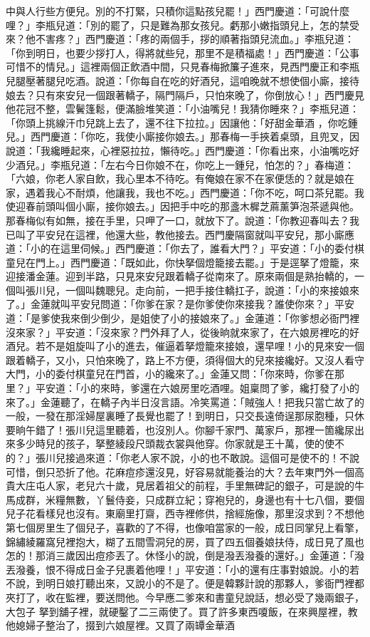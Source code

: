 中與人行些方便兒。別的不打緊，只積你這點孩兒罷！」西門慶道：「可說什麼哩？」李瓶兒道：「別的罷了，只是難為那女孩兒。虧那小嫩指頭兒上，怎的禁受來？他不害疼？」西門慶道：「疼的兩個手，拶的順著指頭兒流血。」李瓶兒道：「你到明日，也要少拶打人，得將就些兒，那里不是積福處！」西門慶道：「公事可惜不的情兒。」這裡兩個正飲酒中間，只見春梅掀簾子進來，見西門慶正和李瓶兒腿壓著腿兒吃酒。說道：「你每自在吃的好酒兒，這咱晚就不想使個小廝，接待娘去？只有來安兒一個跟著轎子，隔門隔戶，只怕來晚了，你倒放心！」西門慶見他花冠不整，雲鬢篷鬆，便滿臉堆笑道：「小油嘴兒！我猜你睡來？」李瓶兒道：「你頭上挑線汗巾兒跳上去了，還不往下拉拉。」因讓他：「好甜金華酒 ，你吃鍾兒。」西門慶道：「你吃，我使小廝接你娘去。」那春梅一手挾着桌頭，且兜叉，因說道：「我纔睡起來，心裡惡拉拉，懶待吃。」西門慶道：「你看出來，小油嘴吃好少酒兒。」李瓶兒道：「左右今日你娘不在，你吃上一鍾兒，怕怎的？」春梅道：「六娘，你老人家自飲，我心里本不待吃。有俺娘在家不在家便恁的？就是娘在家，遇着我心不耐煩，他讓我，我也不吃。」西門慶道：「你不吃，呵口茶兒罷。我使迎春前頭叫個小廝，接你娘去。」因把手中吃的那盞木樨芝蔴薰笋泡茶遞與他。那春梅似有如無，接在手里，只呷了一口，就放下了。說道：「你教迎春叫去？我已叫了平安兒在這裡，他還大些，教他接去。西門慶隔窗就叫平安兒，那小廝應道：「小的在這里伺候。」西門慶道：「你去了，誰看大門？」平安道：「小的委付棋童兒在門上。」西門慶道：「既如此，你快拏個燈籠接去罷。」于是逕拏了燈籠，來迎接潘金蓮。迎到半路，只見來安兒跟着轎子從南來了。原來兩個是熟抬轎的，一個叫張川兒，一個叫魏聰兒。走向前，一把手接住轎扛子，說道：「小的來接娘來了。」金蓮就叫平安兒問道：「你爹在家？是你爹使你來接我？誰使你來？」平安道：「是爹使我來倒少倒少，是姐使了小的接娘來了。」金蓮道：「你爹想必衙門裡沒來家？」平安道：「沒來家？門外拜了人，從後晌就來家了，在六娘房裡吃的好酒兒。若不是姐旋叫了小的進去，催逼着拏燈籠來接娘，還早哩！小的見來安一個跟着轎子，又小，只怕來晚了，路上不方便，須得個大的兒來接纔好。又沒人看守大門，小的委付棋童兒在門首，小的纔來了。」金蓮又問：「你來時，你爹在那里？」平安道：「小的來時，爹還在六娘房里吃酒哩。姐稟問了爹，纔打發了小的來了。」金蓮聽了，在轎子內半日沒言語。冷笑罵道：「賊強人！把我只當亡故了的一般，一發在那淫婦屋裏睡了長覺也罷了！到明日，只交長遠倚逞那尿胞種，只休要晌午錯了！張川兒這里聽着，也沒別人。你腳千家門、萬家戶，那裡一箇纔尿出來多少時兒的孩子，拏整綾段尺頭裁衣裳與他穿。你家就是王十萬，使的使不的？」張川兒接過來道：「你老人家不說，小的也不敢說。這個可是使不的！不說可惜，倒只恐折了他。花麻痘疹還沒見，好容易就能養治的大？去年東門外一個高貴大庄屯人家，老兒六十歲，見居着祖父的前程，手里無碑記的銀子，可是說的牛馬成群，米糧無數，丫鬟侍妾，只成群立紀；穿袍兒的，身邊也有十七八個，要個兒子花看樣兒也沒有。東廟里打齋，西寺裡修供，捨經施像，那里沒求到？不想他第七個房里生了個兒子，喜歡的了不得，也像咱當家的一般，成日同掌兒上看擎，錦繡綾羅窩兒裡抱大，糊了五間雪洞兒的房，買了四五個養娘扶侍，成日見了風也怎的！那消三歲因出痘疹丟了。休怪小的說，倒是潑丟潑養的還好。」金蓮道：「潑丟潑養，恨不得成日金子兒裹着他哩！」平安道：「小的還有庄事對娘說。小的若不說，到明日娘打聽出來，又說小的不是了。便是韓夥計說的那夥人，爹衙門裡都夾打了，收在監裡，要送問他。今早應二爹來和書童兒說話，想必受了幾兩銀子，大包子 拏到舖子裡，就硬鑿了二三兩使了。買了許多東西嗄飯，在來興屋裡，教他媳婦子整治了，掇到六娘屋裡。又買了兩罈金華酒 